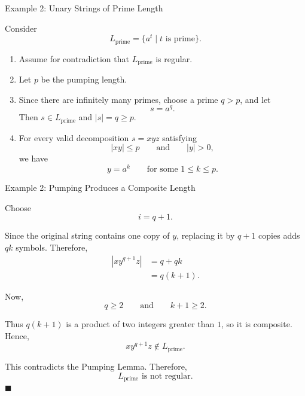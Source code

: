 \documentclass[10pt,aspectratio=169]{beamer}
\begin{document}
\begin{frame}{Example 2: Unary Strings of Prime Length}

\small
Consider
\[
L_{\mathrm{prime}}
=
\{a^t\mid t\text{ is prime}\}.
\]

\begin{enumerate}
    \item Assume for contradiction that \(L_{\mathrm{prime}}\) is regular.

    \item Let \(p\) be the pumping length.

    \item Since there are infinitely many primes, choose a prime
    \(q>p\), and let
    \[
    s=a^q.
    \]
    Then \(s\in L_{\mathrm{prime}}\) and \(|s|=q\geq p\).

    \item For every valid decomposition \(s=xyz\) satisfying
    \[
    |xy|\leq p
    \qquad\text{and}\qquad
    |y|>0,
    \]
    we have
    \[
    y=a^k
    \qquad\text{for some }1\leq k\leq p.
    \]
\end{enumerate}

\end{frame}

\begin{frame}{Example 2: Pumping Produces a Composite Length}

\small
Choose
\[
i=q+1.
\]

Since the original string contains one copy of \(y\), replacing it by
\(q+1\) copies adds \(qk\) symbols. Therefore,
\[
\begin{aligned}
|xy^{q+1}z|
&=q+qk\\
&=q(k+1).
\end{aligned}
\]

Now,
\[
q\geq 2
\qquad\text{and}\qquad
k+1\geq 2.
\]

Thus \(q(k+1)\) is a product of two integers greater than \(1\), so it
is composite. Hence,
\[
xy^{q+1}z\notin L_{\mathrm{prime}}.
\]

This contradicts the Pumping Lemma. Therefore,
\[
\boxed{L_{\mathrm{prime}}\text{ is not regular}.}
\]
\hfill\(\blacksquare\)

\end{frame}
\end{document}
